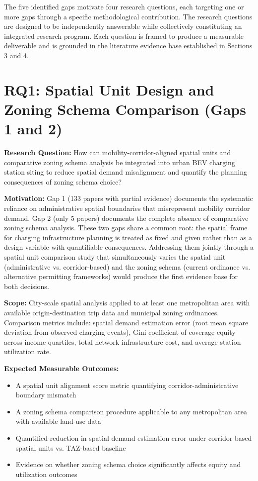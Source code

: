 \documentclass[letterpaper, 12pt, oneside, doublespacing]{Thesis}
\begin{document}
The five identified gaps motivate four research questions, each targeting one or more gaps through a specific methodological contribution. The research questions are designed to be independently answerable while collectively constituting an integrated research program. Each question is framed to produce a measurable deliverable and is grounded in the literature evidence base established in Sections 3 and 4.

\section{RQ1: Spatial Unit Design and Zoning Schema Comparison (Gaps 1 and 2)}


\noindent \textbf{Research Question:} How can mobility-corridor-aligned spatial units and comparative zoning schema analysis be integrated into urban BEV charging station siting to reduce spatial demand misalignment and quantify the planning consequences of zoning schema choice?



\noindent \textbf{Motivation:} Gap 1 (133 papers with partial evidence) documents the systematic reliance on administrative spatial boundaries that misrepresent mobility corridor demand. Gap 2 (only 5 papers) documents the complete absence of comparative zoning schema analysis. These two gaps share a common root: the spatial frame for charging infrastructure planning is treated as fixed and given rather than as a design variable with quantifiable consequences. Addressing them jointly through a spatial unit comparison study that simultaneously varies the spatial unit (administrative vs. corridor-based) and the zoning schema (current ordinance vs. alternative permitting frameworks) would produce the first evidence base for both decisions.



\noindent \textbf{Scope:} City-scale spatial analysis applied to at least one metropolitan area with available origin-destination trip data and municipal zoning ordinances. Comparison metrics include: spatial demand estimation error (root mean square deviation from observed charging events), Gini coefficient of coverage equity across income quartiles, total network infrastructure cost, and average station utilization rate.



\noindent \textbf{Expected Measurable Outcomes:}

\begin{itemize}
  \item A spatial unit alignment score metric quantifying corridor-administrative boundary mismatch
  \item A zoning schema comparison procedure applicable to any metropolitan area with available land-use data
  \item Quantified reduction in spatial demand estimation error under corridor-based spatial units vs. TAZ-based baseline
  \item Evidence on whether zoning schema choice significantly affects equity and utilization outcomes
\end{itemize}
\end{document}
